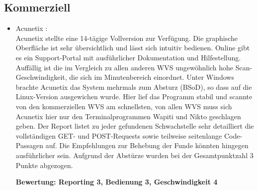 \documentclass[12pt,oneside,a4paper,parskip,pointlessnumbers]{scrbook}
\begin{document}
    \subsection{Kommerziell}
      \begin{itemize}
        \item Acunetix \cite{Acunetix}:\\
          Acunetix stellte eine 14-tägige Vollversion zur Verfügung. Die graphische Oberfläche ist sehr übersichtlich und lässt sich intuitiv bedienen. Online gibt es ein Support-Portal mit ausführlicher Dokumentation und Hilfestellung.
          Auffällig ist die im Vergleich zu allen anderen WVS ungewöhnlich hohe Scan-Geschwindigkeit, die sich im Minutenbereich einordnet.
          Unter Windows brachte Acunetix das System mehrmals zum Absturz (BSoD), so dass auf die Linux-Version ausgewichen wurde. Hier lief das Programm stabil und scannte von den kommerziellen WVS am schnellsten, von allen WVS muss sich Acunetix hier nur den Terminalprogrammen Wapiti und Nikto geschlagen geben. Der Report listet zu jeder gefundenen Schwachstelle sehr detailliert die vollständigen GET- und POST-Requests sowie teilweise seitenlange Code-Passagen auf. Die Empfehlungen zur Behebung der Funde könnten hingegen ausführlicher sein. Aufgrund der Abstürze wurden bei der Gesamtpunktzahl 3 Punkte abgezogen.

          \textbf{Bewertung: Reporting 3, Bedienung 3, Geschwindigkeit 4}\\


\end{itemize}
\end{document}
